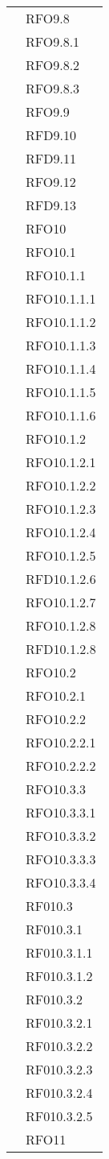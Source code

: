 \begin{longtable}{ p{12cm} | p{4cm} }
			& RFO9.8 \\
			& RFO9.8.1 \\
			& RFO9.8.2 \\
			& RFO9.8.3 \\
			& RFO9.9 \\
			& RFD9.10 \\
			& RFD9.11 \\
			& RFO9.12 \\
			& RFD9.13 \\
			& RFO10 \\
			& RFO10.1 \\
			& RFO10.1.1 \\
			& RFO10.1.1.1 \\
			& RFO10.1.1.2 \\
			& RFO10.1.1.3 \\
			& RFO10.1.1.4 \\
			& RFO10.1.1.5 \\
			& RFO10.1.1.6 \\
			& RFO10.1.2 \\
			& RFO10.1.2.1 \\
			& RFO10.1.2.2 \\
			& RFO10.1.2.3 \\
			& RFO10.1.2.4 \\
			& RFO10.1.2.5 \\
			& RFD10.1.2.6 \\
			& RFO10.1.2.7 \\
			& RFO10.1.2.8 \\
			& RFD10.1.2.8 \\
			& RFO10.2 \\
			& RFO10.2.1 \\
			& RFO10.2.2 \\
			& RFO10.2.2.1 \\
			& RFO10.2.2.2 \\
			& RFO10.3.3 \\
			& RFO10.3.3.1 \\
			& RFO10.3.3.2 \\
			& RFO10.3.3.3 \\
			& RFO10.3.3.4 \\
			& RF010.3 \\
			& RF010.3.1 \\
			& RF010.3.1.1 \\
			& RF010.3.1.2 \\
			& RF010.3.2 \\
			& RF010.3.2.1 \\
			& RF010.3.2.2 \\
			& RF010.3.2.3 \\
			& RF010.3.2.4 \\
			& RF010.3.2.5 \\
			& RFO11 \\							
			\hline
		
		\end{longtable}

